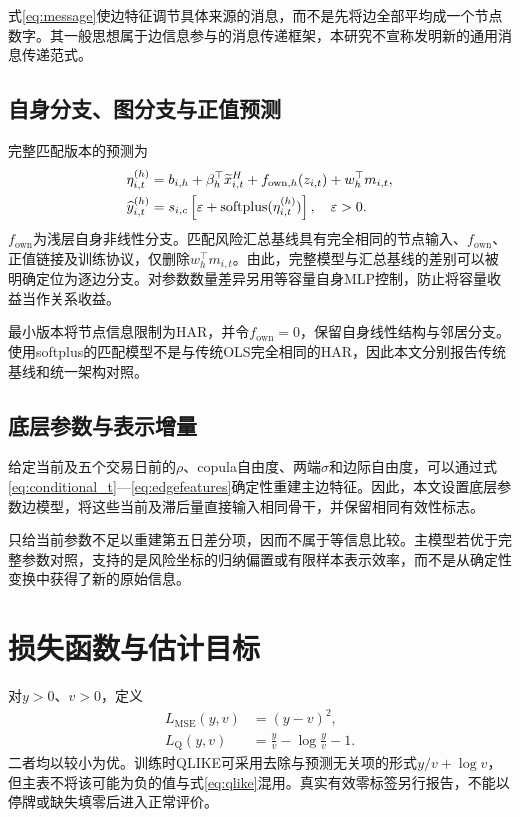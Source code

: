 式\eqref{eq:message}使边特征调节具体来源的消息，而不是先将边全部平均成一个节点数字。其一般思想属于边信息参与的消息传递框架\cite{gilmer2017}，本研究不宣称发明新的通用消息传递范式。

\subsection{自身分支、图分支与正值预测}
完整匹配版本的预测为
\begin{align}
\eta_{i,t}^{(h)}&=b_{i,h}+\beta_h^{\top}\widetilde x^{H}_{i,t}
+f_{\mathrm{own},h}(z_{i,t})+w_h^{\top}m_{i,t},\label{eq:linear_predictor}\\
\widehat y_{i,t}^{(h)}&=s_{i,c}\left[\varepsilon+\operatorname{softplus}(\eta_{i,t}^{(h)})\right],\quad\varepsilon>0.\label{eq:positive_prediction}
\end{align}
$f_{\mathrm{own}}$为浅层自身非线性分支。匹配风险汇总基线具有完全相同的节点输入、$f_{\mathrm{own}}$、正值链接及训练协议，仅删除$w_h^\top m_{i,t}$。由此，完整模型与汇总基线的差别可以被明确定位为逐边分支。对参数数量差异另用等容量自身MLP控制，防止将容量收益当作关系收益。

最小版本将节点信息限制为HAR，并令$f_{\mathrm{own}}=0$，保留自身线性结构与邻居分支。使用softplus的匹配模型不是与传统OLS完全相同的HAR，因此本文分别报告传统基线和统一架构对照。

\subsection{底层参数与表示增量}
给定当前及五个交易日前的$\rho$、copula自由度、两端$\sigma$和边际自由度，可以通过式\eqref{eq:conditional_t}—\eqref{eq:edgefeatures}确定性重建主边特征。因此，本文设置底层参数边模型，将这些当前及滞后量直接输入相同骨干，并保留相同有效性标志。

只给当前参数不足以重建第五日差分项，因而不属于等信息比较。主模型若优于完整参数对照，支持的是风险坐标的归纳偏置或有限样本表示效率，而不是从确定性变换中获得了新的原始信息。

\section{损失函数与估计目标}
对$y>0$、$v>0$，定义
\begin{align}
L_{\mathrm{MSE}}(y,v)&=(y-v)^2,\label{eq:mse}\\
L_{\mathrm{Q}}(y,v)&=\frac yv-\log\frac yv-1.\label{eq:qlike}
\end{align}
二者均以较小为优。训练时QLIKE可采用去除与预测无关项的形式$y/v+\log v$，但主表不将该可能为负的值与式\eqref{eq:qlike}混用。真实有效零标签另行报告，不能以停牌或缺失填零后进入正常评价。

